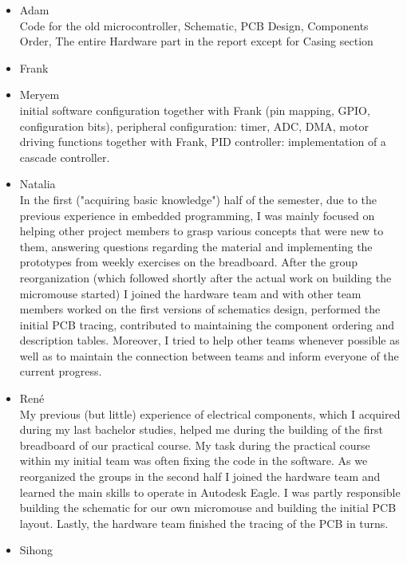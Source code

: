 \documentclass[12pt]{article}
\begin{document}
\begin{itemize}
    \item Adam\\
        Code for the old microcontroller, Schematic, PCB Design, Components Order, The entire Hardware part in the report except for Casing section
    \item Frank\\
    \item Meryem\\
        initial software configuration together with Frank (pin mapping, GPIO, configuration bits), peripheral configuration: timer, ADC, DMA, motor driving functions together with Frank, PID controller: implementation of a cascade controller.
    \item Natalia\\
        In the first ("acquiring basic knowledge") half of the semester, due to the previous experience in embedded programming, I was mainly focused on helping other project members to grasp various concepts that were new to them, answering questions regarding the material and implementing the prototypes from weekly exercises on the breadboard.
        After the group reorganization (which followed shortly after the actual work on building the micromouse started) I joined the hardware team and with other team members worked on the first versions of schematics design, performed the initial PCB tracing, contributed to maintaining the component ordering and description tables. 
        Moreover, I tried to help other teams whenever possible as well as to maintain the connection between teams and inform everyone of the current progress.
    \item René\\
         My previous (but little) experience of electrical components, which I acquired during my last bachelor studies, helped me during the building of the first breadboard of our practical course. My task during the practical course within my initial team was often fixing the code in the software. As we reorganized the groups in the second half I joined the hardware team and learned the main skills to operate in Autodesk Eagle. I was partly responsible building the schematic for our own micromouse and building the initial PCB layout. Lastly, the hardware team finished the tracing of the PCB in turns.
    \item Sihong\\
\end{itemize}


\newpage
\end{document}
